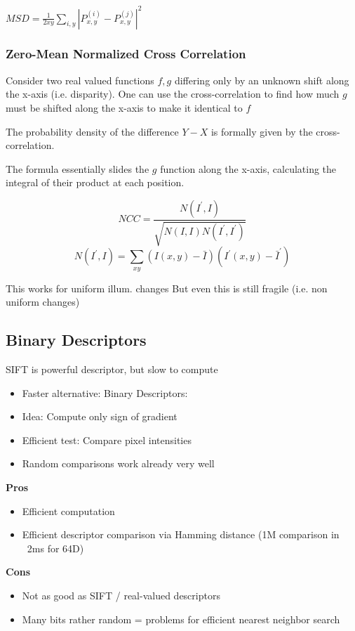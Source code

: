 $MSD=\frac{1}{2xy} \sum_{i,y}\left|P_{x,y}^{(i)} - P^{(j)}_{x,y}\right|^2$


\subsubsection{Zero-Mean Normalized Cross Correlation}
Consider two real valued functions  $f,g$  differing only by an unknown shift along the x-axis (i.e. disparity). One can use the cross-correlation to find how much $g$ must be shifted along the x-axis to make it identical to $f$ 

The probability density of the difference $Y-X$ is formally given by the cross-correlation.

The formula essentially slides the $g$ function along the x-axis, calculating the integral of their product at each position.

$$ NCC = \frac{N(I^\prime,I)}{\sqrt{N(I,I)N(I^\prime,I^\prime)}} $$
$$ N(I^\prime,I) = \sum_{xy} (I(x,y) - \bar I )(I^\prime(x,y) - \bar I^\prime ) $$

This works for uniform illum. changes
But even this is still fragile (i.e. non uniform changes)

\subsection{Binary Descriptors}

SIFT is powerful descriptor, but slow to compute
\begin{itemize}
\item Faster alternative: Binary Descriptors:
\item Idea: Compute only sign of gradient
\item Efficient test: Compare pixel intensities
\item Random comparisons work already very well
\end{itemize}

\textbf{Pros}
\begin{itemize}
\item Efficient computation
\item Efficient descriptor comparison via Hamming distance (1M comparison in ~2ms for 64D)
\end{itemize}

\textbf{Cons}
\begin{itemize}
\item Not as good as SIFT / real-valued descriptors
\item Many bits rather random = problems for efficient nearest neighbor search
\end{itemize}


